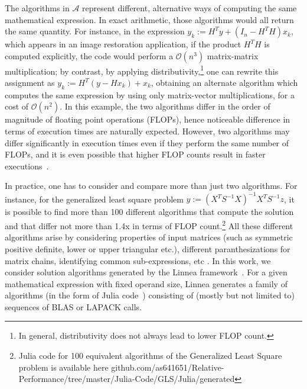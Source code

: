 \documentclass[conference]{IEEEtran}
\begin{document}
The algorithms in $\mathcal{A}$ represent different, alternative ways of computing the same mathematical expression. In
exact arithmetic, those algorithms would all return the same quantity.  For instance,  in the expression $y_k := H^{T}y
+ (I_n - H^{T}H)x_k$, which appears in an image restoration application\cite{tirer2018image}, if the product $H^TH$ is
computed explicitly, the code would perform a $\mathcal{O}(n^3)$ matrix-matrix multiplication; by contrast, by applying
distributivity,\footnote{In general, distributivity does not always lead to lower FLOP count.} one can rewrite this
assignment as $y_k := H^{T}(y - Hx_k) + x_k$, obtaining an alternate algorithm which computes the same expression by
using only matrix-vector multiplications, for a cost of $\mathcal{O}(n^2)$. In this example, the two algorithms differ
in the order of magnitude of floating point operations (FLOPs), hence noticeable difference in terms of execution times are naturally expected. However, two algorithms may differ significantly in execution times even if they perform the same number of FLOPs, and it is even possible that higher FLOP counts result in faster executions~\cite{barthels2019linnea}.


In practice, one has to consider and compare more than just two algorithms.  For instance, for the generalized least square problem $y := (X^TS^{-1}X)^{-1}X^{T}S^{-1}z$, it is possible to find more than 100 different algorithms that compute the solution and that differ not more than 1.4x in terms of FLOP count.\footnote{Julia code for 100 equivalent algorithms of the Generalized Least Square problem is available here github.com/as641651/Relative-Performance/tree/master/Julia-Code/GLS/Julia/generated}  
All these different algorithms arise by considering properties of input matrices (such as symmetric positive definite, lower or upper triangular etc.), different paranthesizations for matrix chains, identifying common sub-expressions, etc \cite{psarras2019linear}. In this work, we consider solution algorithms generated by the Linnea framework~\cite{barthels2019linnea}. For a given mathematical expression with fixed operand size, Linnea generates a family of algorithms (in the form of Julia code~\cite{julia}) consisting of (mostly but not limited to) sequences of BLAS or LAPACK calls.
\end{document}
